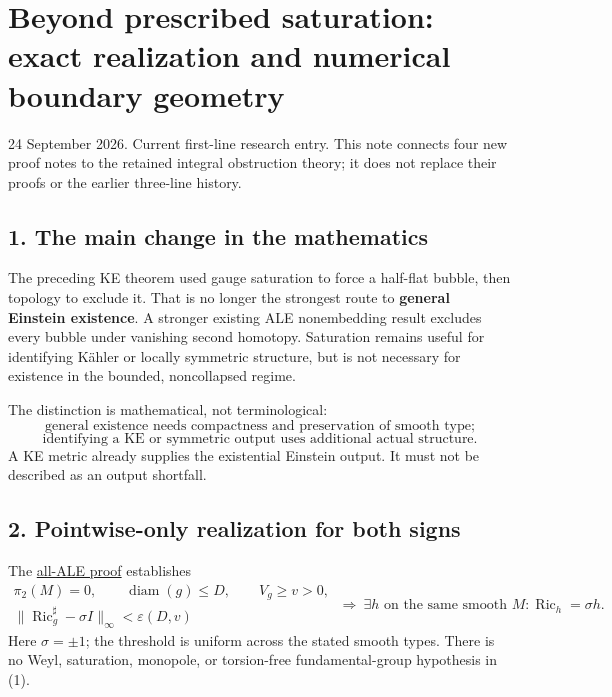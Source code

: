 \documentclass[
  11pt,
]{article}
\author{}
\date{}
\begin{document}
\hypertarget{beyond-prescribed-saturation-exact-realization-and-numerical-boundary-geometry}{%
\section{Beyond prescribed saturation: exact realization and numerical
boundary
geometry}\label{beyond-prescribed-saturation-exact-realization-and-numerical-boundary-geometry}}

24 September 2026. Current first-line research entry. This note connects
four new proof notes to the retained integral obstruction theory; it
does not replace their proofs or the earlier three-line history.

\hypertarget{the-main-change-in-the-mathematics}{%
\subsection{1. The main change in the
mathematics}\label{the-main-change-in-the-mathematics}}

The preceding KE theorem used gauge saturation to force a half-flat
bubble, then topology to exclude it. That is no longer the strongest
route to \textbf{general Einstein existence}. A stronger existing ALE
nonembedding result excludes every bubble under vanishing second
homotopy. Saturation remains useful for identifying Kähler or locally
symmetric structure, but is not necessary for existence in the bounded,
noncollapsed regime.

The distinction is mathematical, not terminological: \[
 \text{general existence needs compactness and preservation of smooth type;}
\] \[
 \text{identifying a KE or symmetric output uses additional actual structure.}
\] A KE metric already supplies the existential Einstein output. It must
not be described as an output shortfall.

\hypertarget{pointwise-only-realization-for-both-signs}{%
\subsection{2. Pointwise-only realization for both
signs}\label{pointwise-only-realization-for-both-signs}}

The \href{20260924_ale_boundary_compatibility.md}{all-ALE proof}
establishes \[
 \boxed{
 \begin{gathered}
 \pi_2(M)=0,\qquad \operatorname{diam}(g)\le D,\qquad V_g\ge v>0,\\
 \|\operatorname{Ric}_g^\sharp-\sigma I\|_\infty<\varepsilon(D,v)
 \end{gathered}
 \ \Longrightarrow\
 \exists h\text{ on the same smooth }M:\operatorname{Ric}_h=\sigma h .
 }\tag{1}
\] Here \(\sigma=\pm1\); the threshold is uniform across the stated
smooth types. There is no Weyl, saturation, monopole, or torsion-free
fundamental-group hypothesis in (1).
\end{document}
